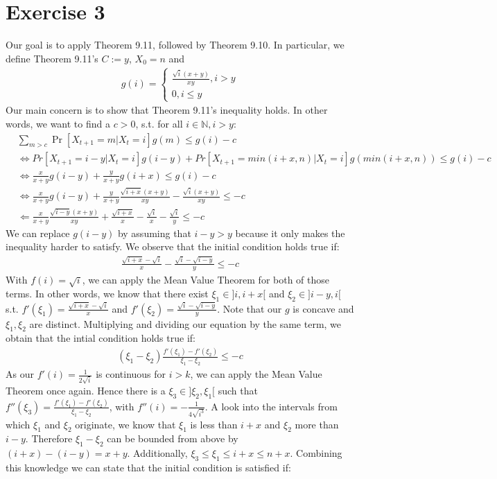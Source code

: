 \documentclass[a4paper,german]{article}
\begin{document}
\section*{Exercise 3}
	Our goal is to apply Theorem 9.11, followed by Theorem 9.10. In particular, we define Theorem 9.11's \(C := y\), \(X_0 = n\) and 
	\begin{align*}
		g(i) = \begin{cases}
			\frac{\sqrt i (x+y)}{xy}, i > y \\
			0, i \leq y
			\end{cases}
	\end{align*}
	Our main concern is to show that Theorem 9.11's inequality holds. In other words, we want to find a \(c > 0\), s.t. for all \(i \in \mathbb{N}, i>y\):
	\begin{align*}
		&\sum_{m>c} \Pr[X_{t+1} = m | X_t = i] g(m) \leq g(i) - c \\
		&\Leftrightarrow Pr[X_{t+1} = i-y|X_t = i] g(i-y) + Pr[X_{t+1} = min(i+x,n) | X_t = i] g(min(i+x,n)) \leq g(i) -c \\
		&\Leftrightarrow \frac{x}{x+y} g(i-y) + \frac{y}{x+y}g(i+x) \leq g(i) -c \\
		&\Leftrightarrow  \frac{x}{x+y} g(i-y) + \frac{y}{x+y}\frac{\sqrt{i+x}(x + y)}{xy} - \frac{\sqrt i (x+y)}{xy}\leq -c \\
		&\Leftarrow \frac{x}{x+y}\frac{\sqrt{i-y}(x+y)}{xy} + \frac{\sqrt{i+x}}{x} - \frac{\sqrt i}{x} - \frac{\sqrt i}{y }\leq -c
	\end{align*}
	We can replace \(g(i-y)\) by assuming that \(i-y > y\) because it only makes the inequality harder to satisfy. We observe that the initial condition holds true if:
	\begin{align*}
		\frac{\sqrt{i+x} - \sqrt i }{x} - \frac{\sqrt i - \sqrt{i-y}}{y} \leq -c
	\end{align*}
	With \(f(i) = \sqrt i\), we can apply the Mean Value Theorem for both of those terms.  In other words, we know that there exist \(\xi_1 \in ]i, i+x[\) and \(\xi_2 \in ]i-y, i[\) s.t. \(f'(\xi_1) = \frac{\sqrt{i+x} - \sqrt i }{x} \) and \(f'(\xi_2) = \frac{\sqrt i - \sqrt{i-y}}{y}\). Note that our \(g\) is concave and \(\xi_1, \xi_2\) are distinct. Multiplying and dividing our equation by the same term, we obtain that the intial condition holds true if:
	\begin{align*}
		(\xi_1 - \xi_2) \frac{f'(\xi_1) - f'(\xi_2)}{\xi_1 - \xi_2} \leq -c
	\end{align*} 
	As our \(f'(i) = \frac{1}{2\sqrt i}\) is continuous for \(i > k\), we can apply the Mean Value Theorem once again. Hence there is a \(\xi_3 \in ]\xi_2, \xi_1[\) such that \(f''(\xi_3) = \frac{f'(\xi_1) - f'(\xi_2)}{\xi_1 - \xi_2} \), with \(f''(i) = - \frac{1}{4\sqrt{i^3}}\). A look into the intervals from which \(\xi_1\) and \(\xi_2\) originate, we know that \(\xi_1\) is less than \(i+x\) and \(\xi_2\) more than \(i-y\). Therefore \(\xi_1 - \xi_2\) can be bounded from above by \((i+x) - (i - y) = x + y\). Additionally, \(\xi_3 \leq \xi_1 \leq i +x \leq n +x\).  Combining this knowledge we can state that the initial condition is satisfied if:
\end{document}
